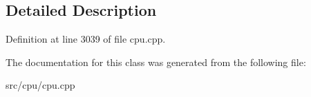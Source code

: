 \subsection{Detailed Description}


Definition at line 3039 of file cpu.\-cpp.



The documentation for this class was generated from the following file\-:\begin{DoxyCompactItemize}
\item 
src/cpu/cpu.\-cpp\end{DoxyCompactItemize}

